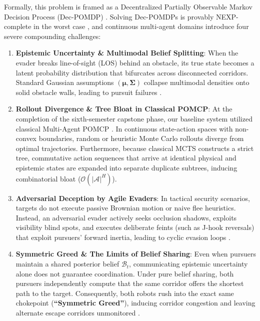 \documentclass[conference]{IEEEtran}
\begin{document}
Formally, this problem is framed as a Decentralized Partially Observable Markov Decision Process (Dec-POMDP) \cite{oliehoek2016concise, bernstein2002complexity}. Solving Dec-POMDPs is provably NEXP-complete in the worst case \cite{bernstein2002complexity}, and continuous multi-agent domains introduce four severe compounding challenges:
\begin{enumerate}
    \item \textbf{Epistemic Uncertainty \& Multimodal Belief Splitting}: When the evader breaks line-of-sight (LOS) behind an obstacle, its true state becomes a latent probability distribution that bifurcates across disconnected corridors. Standard Gaussian assumptions $(\boldsymbol{\mu}, \boldsymbol{\Sigma})$ collapse multimodal densities onto solid obstacle walls, leading to pursuit failures \cite{somani2013despot}.
    \item \textbf{Rollout Divergence \& Tree Bloat in Classical POMCP}: At the completion of the sixth-semester capstone phase, our baseline system utilized classical Multi-Agent POMCP \cite{silver2010monte}. In continuous state-action spaces with non-convex boundaries, random or heuristic Monte Carlo rollouts diverge from optimal trajectories. Furthermore, because classical MCTS constructs a strict tree, commutative action sequences that arrive at identical physical and epistemic states are expanded into separate duplicate subtrees, inducing combinatorial bloat ($\mathcal{O}(|\mathcal{A}|^H)$).
    \item \textbf{Adversarial Deception by Agile Evaders}: In tactical security scenarios, targets do not execute passive Brownian motion or naive flee heuristics. Instead, an adversarial evader actively seeks occlusion shadows, exploits visibility blind spots, and executes deliberate feints (such as J-hook reversals) that exploit pursuers' forward inertia, leading to cyclic evasion loops \cite{aleksandrov2021pursuit}.
    \item \textbf{Symmetric Greed \& The Limits of Belief Sharing}: Even when pursuers maintain a shared posterior belief $\mathcal{B}_t$, communicating epistemic uncertainty alone does not guarantee coordination. Under pure belief sharing, both pursuers independently compute that the same corridor offers the shortest path to the target. Consequently, both robots rush into the exact same chokepoint (\textbf{``Symmetric Greed''}), inducing corridor congestion and leaving alternate escape corridors unmonitored \cite{foerster2016learning, macalpine2018customized}.
\end{enumerate}
\end{document}
